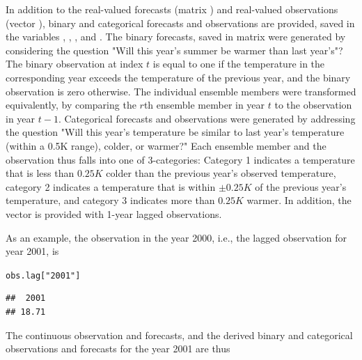 \documentclass[article]{jss}\usepackage{graphicx, color}
\makeatletter
\newcommand{\hlstring}[1]{\textcolor[rgb]{0.650980392156863,0.52156862745098,0}{#1}}%
\newenvironment{kframe}{%
 \def\at@end@of@kframe{}%
 \ifinner\ifhmode%
  \def\at@end@of@kframe{\end{minipage}}%
  \begin{minipage}{\columnwidth}%
 \fi\fi%
 \def\FrameCommand##1{\hskip\@totalleftmargin \hskip-\fboxsep
 \colorbox{shadecolor}{##1}\hskip-\fboxsep
     \hskip-\linewidth \hskip-\@totalleftmargin \hskip\columnwidth}%
 \MakeFramed {\advance\hsize-\width
   \@totalleftmargin\z@ \linewidth\hsize
   \@setminipage}}%
 {\par\unskip\endMakeFramed%
 \at@end@of@kframe}
\newenvironment{knitrout}{}{} %
\makeatother
\begin{document}
In addition to the real-valued forecasts (matrix ) and real-valued observations (vector ), binary and categorical forecasts and observations are provided, saved in the variables , , , and .
The binary forecasts, saved in matrix  were generated by considering the question "Will this year's summer be warmer than last year's"?
The binary observation at index $t$ is equal to one if the temperature in the corresponding year exceeds the temperature of the previous year, and the binary observation is zero otherwise.
The individual ensemble members were transformed equivalently, by comparing the $r$th ensemble member in year $t$ to the observation in year $t-1$.
Categorical forecasts and observations were generated by addressing the question "Will this year's temperature be similar to last year's temperature (within a 0.5K range), colder, or warmer?"
Each ensemble member and the observation thus falls into one of 3-categories: Category 1 indicates a temperature that is less than $0.25K$ colder than the previous year's observed temperature, category 2 indicates a temperature that is within $\pm 0.25K$ of the previous year's temperature, and category 3 indicates more than $0.25K$ warmer.
In addition, the vector  is provided with 1-year lagged observations.

As an example, the observation in the year 2000, i.e., the lagged observation for year 2001, is

\begin{knitrout}
\color{fgcolor}\begin{kframe}
\begin{alltt}
obs.lag[\hlstring{"2001"}]
\end{alltt}
\begin{verbatim}
##  2001 
## 18.71
\end{verbatim}
\end{kframe}
\end{knitrout}


The continuous observation and forecasts, and the derived binary and categorical observations and forecasts for the year 2001 are thus
\end{document}
